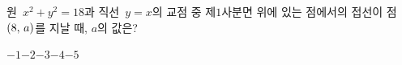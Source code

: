 원~$x^2+y^2=18$과 직선~$y=x$의 교점 중 제$1$사분면 위에 있는 점에서의 접선이 점~$(8,\mkern3mu a)$를 지날 때, $a$의 값은?
\begin{choices32}{$-1$}{$-2$}{$-3$}{$-4$}{$-5$}\end{choices32}
